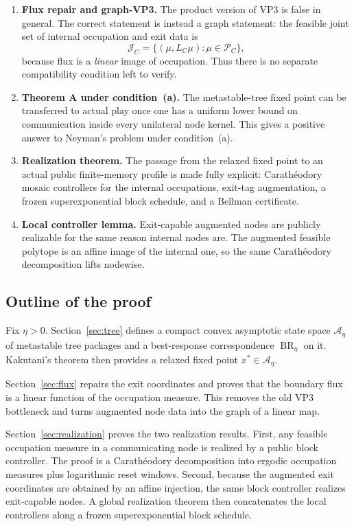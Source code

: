 \documentclass[12pt]{article}
\theoremstyle{definition}
\newcommand{\1}{\mathbf{1}}
\newcommand{\cA}{\mathcal{A}}
\newcommand{\cP}{\mathcal{P}}
\begin{document}
\begin{enumerate}[label=\textnormal{(\roman*)},leftmargin=2.6em]
\item \textbf{Flux repair and graph-VP3.}
The product version of VP3 is false in general.  The correct statement is instead a graph
statement: the feasible joint set of internal occupation and exit data is
\[
\mathcal J_C=\{(\mu,L_C\mu):\mu\in \cP_C\},
\]
because flux is a \emph{linear} image of occupation.  Thus there is no separate
compatibility condition left to verify.

\item \textbf{Theorem A under condition~(a).}
The metastable-tree fixed point can be transferred to actual play once one has a uniform
lower bound on communication inside every unilateral node kernel.  This gives a positive
answer to Neyman's problem under condition~(a).

\item \textbf{Realization theorem.}
The passage from the relaxed fixed point to an actual public finite-memory profile is made
fully explicit: Carath\'eodory mosaic controllers for the internal occupations, exit-tag
augmentation, a frozen superexponential block schedule, and a Bellman certificate.

\item \textbf{Local controller lemma.}
Exit-capable augmented nodes are publicly realizable for the same reason internal nodes
are.  The augmented feasible polytope is an affine image of the internal one, so the same
Carath\'eodory decomposition lifts nodewise.
\end{enumerate}

\subsection{Outline of the proof}

Fix $\eta>0$.  Section~\ref{sec:tree} defines a compact convex asymptotic state space
$\cA_\eta$ of metastable tree packages and a best-response correspondence
$\operatorname{BR}_\eta$ on it.  Kakutani's theorem then provides a relaxed fixed point
$x^*\in \cA_\eta$.

Section~\ref{sec:flux} repairs the exit coordinates and proves that the boundary flux is a
linear function of the occupation measure.  This removes the old VP3 bottleneck and turns
augmented node data into the graph of a linear map.

Section~\ref{sec:realization} proves the two realization results.  First, any feasible
occupation measure in a communicating node is realized by a public block controller.  The
proof is a Carath\'eodory decomposition into ergodic occupation measures plus logarithmic
reset windows.  Second, because the augmented exit coordinates are obtained by an affine
injection, the same block controller realizes exit-capable nodes.  A global realization
theorem then concatenates the local controllers along a frozen superexponential block
schedule.
\end{document}
